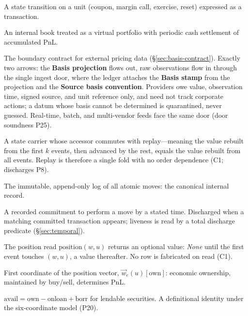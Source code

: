 \documentclass[11pt,a4paper]{article}
\begin{document}
\begin{description}[style=nextline]
\item[Lifecycle event] A state transition on a unit (coupon, margin call, exercise, reset) expressed as a transaction.

\item[Managed account] An internal book treated as a virtual portfolio with periodic cash settlement of accumulated PnL.

\item[Market-data contract] The boundary contract for external pricing data (\S\ref{sec:basis-contract}). Exactly two arrows: the \textbf{Basis projection} flows out, raw observations flow in through the single ingest door, where the ledger attaches the \textbf{Basis stamp} from the projection and the \textbf{Source basis convention}. Providers owe value, observation time, signed source, and unit reference only, and need not track corporate actions; a datum whose basis cannot be determined is quarantined, never guessed. Real-time, batch, and multi-vendor feeds face the same door (door soundness P25).

\item[Monotone carrier] A state carrier whose accessor commutes with replay---meaning the value rebuilt from the first $k$ events, then advanced by the rest, equals the value rebuilt from all events. Replay is therefore a single fold with no order dependence (C1; discharges P8).

\item[Move stream] The immutable, append-only log of all atomic moves: the canonical internal record.

\item[Obligation] A recorded commitment to perform a move by a stated time. Discharged when a matching committed transaction appears; liveness is read by a total discharge predicate (\S\ref{sec:temporal}).

\item[Option accessor] The position read $\mathrm{position}(w,u)$ returns an optional value: \emph{None} until the first event touches $(w,u)$, a value thereafter. No row is fabricated on read (C1).

\item[Own] First coordinate of the position vector, $\vec{w}_e(u)[\mathrm{own}]$: economic ownership, maintained by buy/sell, determines PnL.

\item[Ownership consistency] $\mathrm{avail}=\mathrm{own}-\mathrm{onloan}+\mathrm{borr}$ for lendable securities. A definitional identity under the six-coordinate model (P20).


\end{description}
\end{document}
